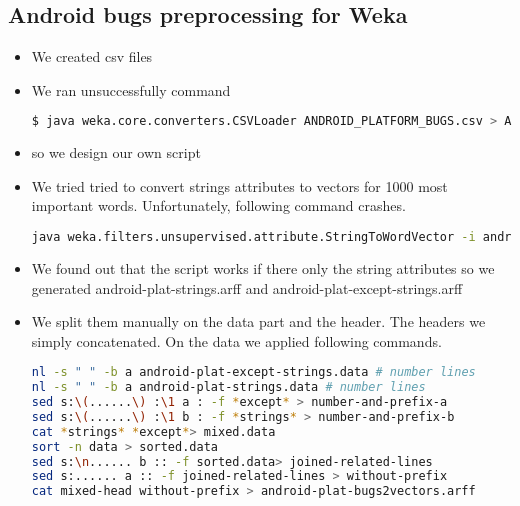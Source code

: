 \subsection{Android bugs preprocessing for Weka} %
\label{sub:Android bugs preprocessing for Weka}
\begin{itemize}
    \item We created csv files
    \item We ran unsuccessfully command
\begin{lstlisting}[language=sh]
$ java weka.core.converters.CSVLoader ANDROID_PLATFORM_BUGS.csv > ANDROID_PLATFORM_BUGS.arff
\end{lstlisting}
    \item so we design our own script
    \item  We tried tried to convert strings attributes to vectors for 1000 most important words. Unfortunately, following command crashes.
\begin{lstlisting}[language=sh]
    java weka.filters.unsupervised.attribute.StringToWordVector -i android-platform-bugs.arff -o android_plat-bugs-Vectors.arff
\end{lstlisting}
    \item We found out that the script works if there only the string attributes so we generated
    android-plat-strings.arff and android-plat-except-strings.arff
    \item We split them manually on the data part and the header.
    The headers we simply concatenated. On the data we applied following commands.
\begin{lstlisting}[language=sh]
nl -s " " -b a android-plat-except-strings.data # number lines
nl -s " " -b a android-plat-strings.data # number lines
sed s:\(......\) :\1 a : -f *except* > number-and-prefix-a
sed s:\(......\) :\1 b : -f *strings* > number-and-prefix-b
cat *strings* *except*> mixed.data
sort -n data > sorted.data
sed s:\n...... b :: -f sorted.data> joined-related-lines
sed s:...... a :: -f joined-related-lines > without-prefix
cat mixed-head without-prefix > android-plat-bugs2vectors.arff
\end{lstlisting}

    
\end{itemize}

